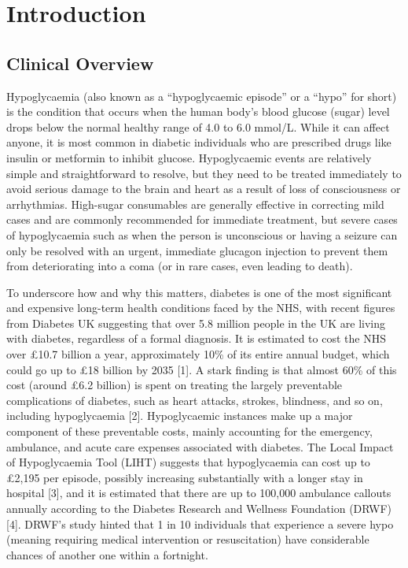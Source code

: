 \section{Introduction}

\begin{flushleft}
\end{flushleft}

\subsection{Clinical Overview}
\par{ \noindent Hypoglycaemia (also known as a “hypoglycaemic episode” or a “hypo” for short) is the condition that occurs when the human body’s blood glucose (sugar) level drops below the normal healthy range of 4.0 to 6.0 mmol/L. While it can affect anyone, it is most common in diabetic individuals who are prescribed drugs like insulin or metformin to inhibit glucose. Hypoglycaemic events are relatively simple and straightforward to resolve, but they need to be treated immediately to avoid serious damage to the brain and heart as a result of loss of consciousness or arrhythmias. High-sugar consumables are generally effective in correcting mild cases and are commonly recommended for immediate treatment, but severe cases of hypoglycaemia such as when the person is unconscious or having a seizure can only be resolved with an urgent, immediate glucagon injection to prevent them from deteriorating into a coma (or in rare cases, even leading to death). }


\vspace{10pt}
\par{\noindent To underscore how and why this matters, diabetes is one of the most significant and expensive long-term health conditions faced by the NHS, with recent figures from Diabetes UK suggesting that over 5.8 million people in the UK are living with diabetes, regardless of a formal diagnosis. It is estimated to cost the NHS over £10.7 billion a year, approximately 10\% of its entire annual budget, which could go up to £18 billion by 2035 [1]. A stark finding is that almost 60\% of this cost (around £6.2 billion) is spent on treating the largely preventable complications of diabetes, such as heart attacks, strokes, blindness, and so on, including hypoglycaemia [2]. Hypoglycaemic instances make up a major component of these preventable costs, mainly accounting for the emergency, ambulance, and acute care expenses associated with diabetes. The Local Impact of Hypoglycaemia Tool (LIHT) suggests that hypoglycaemia can cost up to £2,195 per episode, possibly increasing substantially with a longer stay in hospital [3], and it is estimated that there are up to 100,000 ambulance callouts annually according to the Diabetes Research and Wellness Foundation (DRWF) [4]. DRWF’s study hinted that 1 in 10 individuals that experience a severe hypo (meaning requiring medical intervention or resuscitation) have considerable chances of another one within a fortnight.}

